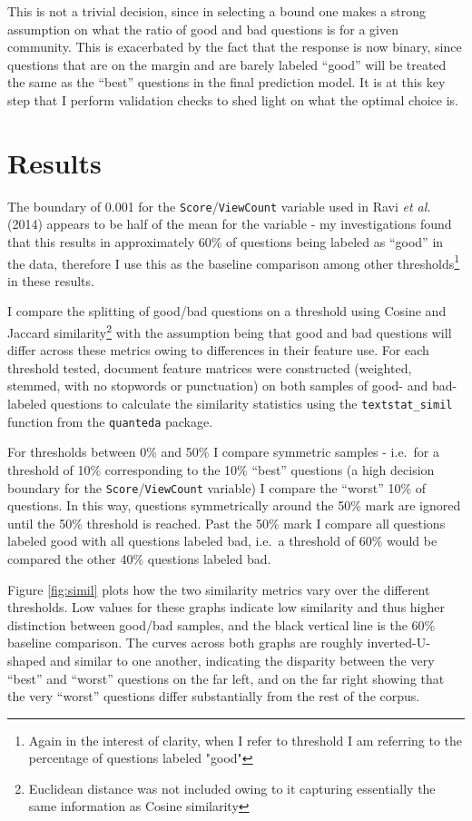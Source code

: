 \documentclass[12pt,preprint, authoryear]{article}
\numberwithin{equation}{section}
\numberwithin{figure}{section}
\numberwithin{table}{section}
\let\rmarkdownfootnote\footnote%
\def\footnote{\protect\rmarkdownfootnote}
\begin{document}
This is not a trivial decision, since in selecting a bound one makes a
strong assumption on what the ratio of good and bad questions is for a
given community. This is exacerbated by the fact that the response is
now binary, since questions that are on the margin and are barely
labeled ``good'' will be treated the same as the ``best'' questions in
the final prediction model. It is at this key step that I perform
validation checks to shed light on what the optimal choice is.

\newpage

\section{Results}\label{results}

The boundary of 0.001 for the \texttt{Score}/\texttt{ViewCount} variable
used in Ravi \emph{et al.} (2014) appears to be half of the mean for the
variable - my investigations found that this results in approximately
60\% of questions being labeled as ``good'' in the data, therefore I use
this as the baseline comparison among other
thresholds\footnote{Again in the interest of clarity, when I refer to threshold I am referring to the percentage of questions labeled "good"}
in these results.

I compare the splitting of good/bad questions on a threshold using
Cosine and Jaccard
similarity\footnote{Euclidean distance was not included owing to it capturing essentially the same information as Cosine similarity}
with the assumption being that good and bad questions will differ across
these metrics owing to differences in their feature use. For each
threshold tested, document feature matrices were constructed (weighted,
stemmed, with no stopwords or punctuation) on both samples of good- and
bad-labeled questions to calculate the similarity statistics using the
\texttt{textstat\_simil} function from the \texttt{quanteda} package.

For thresholds between 0\% and 50\% I compare symmetric samples -
i.e.~for a threshold of 10\% corresponding to the 10\% ``best''
questions (a high decision boundary for the
\texttt{Score}/\texttt{ViewCount} variable) I compare the ``worst'' 10\%
of questions. In this way, questions symmetrically around the 50\% mark
are ignored until the 50\% threshold is reached. Past the 50\% mark I
compare all questions labeled good with all questions labeled bad,
i.e.~a threshold of 60\% would be compared the other 40\% questions
labeled bad.

Figure \ref{fig:simil} plots how the two similarity metrics vary over
the different thresholds. Low values for these graphs indicate low
similarity and thus higher distinction between good/bad samples, and the
black vertical line is the 60\% baseline comparison. The curves across
both graphs are roughly inverted-U-shaped and similar to one another,
indicating the disparity between the very ``best'' and ``worst''
questions on the far left, and on the far right showing that the very
``worst'' questions differ substantially from the rest of the corpus.
\end{document}

